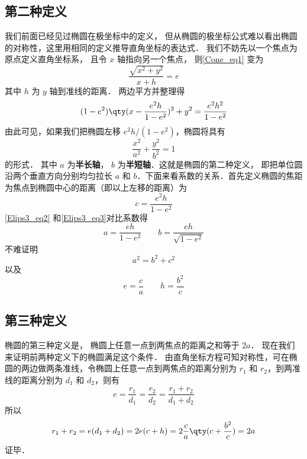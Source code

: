 

\subsection{第二种定义}
我们前面已经见过椭圆在极坐标中的定义， 但从椭圆的极坐标公式难以看出椭圆的对称性，这里用相同的定义推导直角坐标的表达式． 我们不妨先以一个焦点为原点定义直角坐标系， 且令 $x$ 轴指向另一个焦点， 则\autoref{Cone_eq1} 变为
\begin{equation}
\frac{\sqrt{x^2 + y^2} }{x + h} = e
\end{equation}
其中 $h$ 为 $y$ 轴到准线的距离． 两边平方并整理得
\begin{equation}\label{Elips3_eq2}
(1 - e^2) \qty( x - \frac{e^2 h}{1 - e^2} )^2 + y^2 = \frac{e^2 h^2}{1 - e^2}
\end{equation}
由此可见，如果我们把椭圆左移 $e^2 h/(1 - e^2)$，椭圆将具有
\begin{equation}\label{Elips3_eq3}
\frac{x^2}{a^2} + \frac{y^2}{b^2} = 1
\end{equation}
的形式． 其中 $a$ 为\textbf{半长轴}， $b$ 为\textbf{半短轴}．这就是椭圆的第二种定义， 即把单位圆沿两个垂直方向分别均匀拉长 $a$ 和 $b$．下面来看系数的关系．首先定义椭圆的焦距为焦点到椭圆中心的距离（即以上左移的距离）为
\begin{equation}
c = \frac{e^2 h}{1 - e^2}
\end{equation}
\autoref{Elips3_eq2} 和\autoref{Elips3_eq3}对比系数得
\begin{equation}
a = \frac{eh}{1 - e^2} \qquad b = \frac{eh}{\sqrt {1 - e^2} }
\end{equation}
不难证明
\begin{equation}
a^2 = b^2 + c^2
\end{equation}
以及
\begin{equation}
e = \frac{c}{a} \qquad h = \frac{b^2}{c}
\end{equation}

\subsection{第三种定义}
椭圆的第三种定义是， 椭圆上任意一点到两焦点的距离之和等于 $2a$． 现在我们来证明前两种定义下的椭圆满足这个条件． 由直角坐标方程可知对称性，可在椭圆的两边做两条准线，令椭圆上任意一点到两焦点的距离分别为 $r_1$ 和 $r_2$，到两准线的距离分别为 $d_1$ 和 $d_2$，则有
\begin{equation}
e = \frac{r_1}{d_1} = \frac{r_2}{d_2} = \frac{r_1 + r_2}{d_1 + d_2}
\end{equation}
所以
\begin{equation}
r_1 + r_2 = e(d_1+d_2) = 2e(c + h) = 2\frac{c}{a} \qty( c + \frac{b^2}{c} ) = 2a
\end{equation}
证毕．
